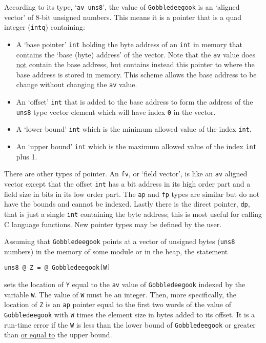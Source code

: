 \documentclass[12pt]{article}
\begin{document}
According to its type,
`{\tt av uns8}', the value of {\tt Gobbledeegook} is an `aligned vector'
of 8-bit unsigned numbers.  This means it is a
pointer that is a quad integer ({\tt intq}) containing:
\begin{itemize}
\item A `base pointer' {\tt int} holding the byte address
of an {\tt int} in memory
that contains the `base (byte) address' of the vector.
Note that the {\tt av} value does \underline{not} contain
the base address, but contains instead this pointer to where
the base address is stored in memory.  This scheme allows
the base address to be change without changing the {\tt av} value.
\item An `offset' {\tt int} that is added to the base address
to form the address of the {\tt uns8} type vector element
which will have index {\tt 0} in the vector.
\item A `lower bound' {\tt int} which is the minimum allowed
value of the index {\tt int}.
\item An `upper bound' {\tt int} which is the maximum allowed
value of the index {\tt int} plus 1.
\end{itemize}

There are other types of pointer.  An {\tt fv}, or `field vector',
is like an {\tt av} aligned
vector except that the offset {\tt int} has a bit address in its
high order part and a field size in bits in its low order part.
The {\tt ap} and {\tt fp} types are
similar but do not have the bounds and cannot be indexed.  Lastly
there is the direct pointer, {\tt dp}, that is just a single {\tt int}
containing the byte address; this is most useful for calling
C language functions.
New pointer types may be defined by the user.


Assuming that {\tt Gobbledeegook} points at a vector of unsigned
bytes ({\tt uns8} numbers)
in the memory of some module or in the heap, the statement
\begin{center}
\tt uns8 @ Z = @ Gobbledeegook[W]
\end{center}
sets the location of {\tt Y} equal to the {\tt av} value of
{\tt Gobbledeegook} indexed by the variable {\tt W}.
The value of {\tt W} must be an integer.
Then, more specifically, the location of {\tt Z} is an {\tt ap} pointer 
equal to the first two words of the value of {\tt Gobbledeegook}
with {\tt W} times the element size in bytes added to its offset.
It is a run-time error if the {\tt W} is less than the lower
bound of {\tt Gobbledeegook} or greater than \underline{or equal to}
the upper bound.
\end{document}
